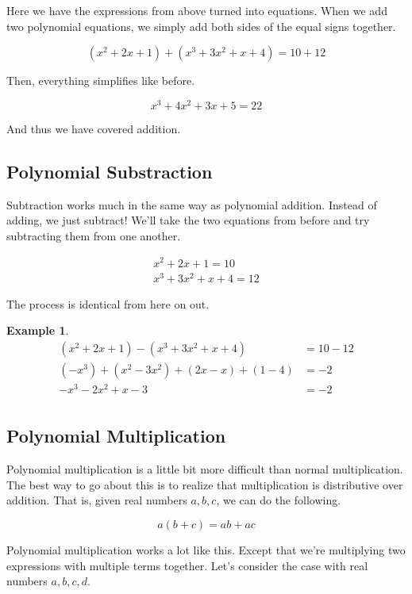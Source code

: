 \documentclass{scrbook}
\theoremstyle{definition}
\newtheorem{example}{Example}
\begin{document}
Here we have the expressions from above turned into equations. When we add two polynomial equations, we simply add both sides of the equal signs together. 

\[
  (x^2 + 2x + 1) + (x^3 + 3x^2 + x + 4) = 10 + 12
\]

Then, everything simplifies like before.

\[
  x^3 + 4x^2 + 3x + 5 = 22
\]

And thus we have covered addition.

\subsection{Polynomial Substraction}

Subtraction works much in the same way as polynomial addition. Instead of adding, we just subtract! We'll take the two equations from before and try subtracting them from one another.

\begin{align*}
  x^2 + 2x + 1 = 10\\
  x^3 + 3x^2 + x + 4 = 12
\end{align*}

The process is identical from here on out. 

\begin{example}
\begin{align*}
  (x^2 + 2x + 1) - (x^3 + 3x^2 + x + 4) &= 10 - 12\\
  (-x^3) + (x^2 - 3x^2) + (2x - x) + (1 - 4) &= -2\\
  -x^3 - 2x^2 + x - 3 &= -2\\
\end{align*}
\end{example}

\subsection{Polynomial Multiplication}

Polynomial multiplication is a little bit more difficult than normal multiplication. The best way to go about this is to realize that multiplication is distributive over addition. That is, given real numbers $a, b, c$, we can do the following.

\[
  a(b + c) = ab + ac
\]

Polynomial multiplication works a lot like this. Except that we're multiplying two expressions with multiple terms together. Let's consider the case with real numbers $a, b, c, d$.
\end{document}
